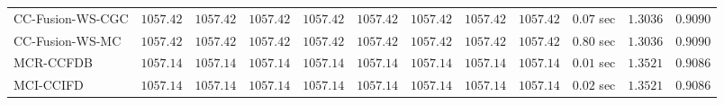 \begin{table}[H]
\begin{tabular}{lrrrrrrrrrrr}
    CC-Fusion-WS-CGC & $      1057.42$ & $      1057.42$ & $      1057.42$ & $      1057.42$ & $      1057.42$ & $      1057.42$ & $      1057.42$ & $      1057.42$ & $         0.07$ sec    & $       1.3036$  & $       0.9090$ \\ 
     CC-Fusion-WS-MC & $      1057.42$ & $      1057.42$ & $      1057.42$ & $      1057.42$ & $      1057.42$ & $      1057.42$ & $      1057.42$ & $      1057.42$ & $         0.80$ sec    & $       1.3036$  & $       0.9090$ \\ 
\cmidrule{1-1} 
           MCR-CCFDB & $      1057.14$ & $      1057.14$ & $      1057.14$ & $      1057.14$ & $      1057.14$ & $      1057.14$ & $      1057.14$ & $      1057.14$ & $         0.01$ sec    & $       1.3521$  & $       0.9086$ \\ 
\cmidrule{1-1} 
           MCI-CCIFD & $      1057.14$ & $      1057.14$ & $      1057.14$ & $      1057.14$ & $      1057.14$ & $      1057.14$ & $      1057.14$ & $      1057.14$ & $         0.02$ sec    & $       1.3521$  & $       0.9086$ \\ 
\bottomrule
\end{tabular}
\end{table}

